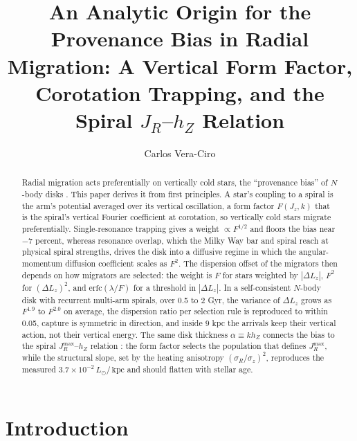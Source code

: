 \documentclass[twocolumn]{aastex701}
\newcommand{\Jz}{J_z}
\newcommand{\Lz}{L_z}
\newcommand{\JR}{J_R}
\newcommand{\hZ}{h_Z}
\newcommand{\sigz}{\sigma_z}
\newcommand{\sigR}{\sigma_R}
\newcommand{\Lsun}{L_\odot}
\newcommand{\kpc}{\,\mathrm{kpc}}
\begin{document}
\title{An Analytic Origin for the Provenance Bias in Radial Migration: A Vertical
Form Factor, Corotation Trapping, and the Spiral $\JR$--$\hZ$ Relation}

\author[0000-0002-5727-8025]{Carlos Vera-Ciro}

\begin{abstract}
Radial migration acts preferentially on vertically cold stars, the ``provenance
bias'' of $N$-body disks \citep{VeraCiro2016imprint,Mikkola2020}. This paper derives it from first principles. A
star's coupling to a spiral is the arm's potential averaged over its vertical
oscillation, a form factor $F(\Jz,k)$ that is the spiral's vertical Fourier coefficient at
corotation, so vertically cold stars migrate preferentially.
Single-resonance trapping gives a weight $\propto F^{1/2}$ and floors the bias
near $-7$ percent, whereas resonance overlap, which the Milky Way bar and spiral reach at
physical spiral strengths, drives the disk into a diffusive regime in which the
angular-momentum diffusion coefficient scales as $F^2$. The dispersion offset of the
migrators then depends on how migrators are selected: the weight is $F$ for stars
weighted by $|\Delta\Lz|$, $F^2$ for $(\Delta\Lz)^2$, and $\mathrm{erfc}(\lambda/F)$ for
a threshold in $|\Delta\Lz|$. In a self-consistent $N$-body disk with recurrent
multi-arm spirals, over 0.5 to 2 Gyr, the variance of $\Delta\Lz$
grows as $F^{1.9}$ to $F^{2.0}$ on average, the dispersion ratio
per selection rule is reproduced to within 0.05, capture is symmetric in direction, and
inside 9 kpc the arrivals keep their vertical action, not their vertical energy.
The same disk thickness $\alpha\equiv k\hZ$ connects the bias to the spiral
$\JR^{\max}$--$\hZ$ relation \citep{Palicio2024}: the form factor selects the population
that defines $\JR^{\max}$, while the structural slope, set by the heating anisotropy
$(\sigR/\sigz)^2$, reproduces the measured $3.7\times10^{-2}\,\Lsun/\kpc$ and should
flatten with stellar age.
\end{abstract}


\section{Introduction}
\label{sec:intro}
\end{document}
